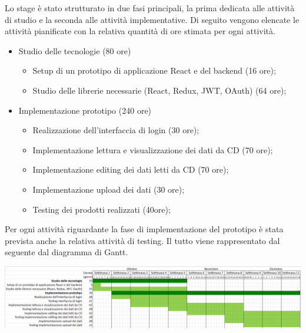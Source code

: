 Lo stage è stato strutturato in due fasi principali, la prima dedicata alle attività di studio e la seconda alle attività implementative. Di seguito vengono elencate le attività pianificate con la relativa quantità di ore stimata per ogni attività.

\begin{itemize}
\item Studio delle tecnologie (80 ore)
\begin{itemize}
\item Setup di un prototipo di applicazione React e del backend (16 ore);
\item Studio delle librerie necessarie (React, Redux, JWT, OAuth) (64 ore);
\end{itemize}
\item Implementazione prototipo (240 ore)
\begin{itemize}
\item Realizzazione dell’interfaccia di login (30 ore);
\item Implementazione lettura e visualizzazione dei dati da CD (70 ore);
\item Implementazione editing dei dati letti da CD (70 ore);
\item Implementazione upload dei dati (30 ore);
\item Testing dei prodotti realizzati (40ore);
\end{itemize}
\end{itemize}

Per ogni attività riguardante la fase di implementazione del prototipo è stata prevista anche la relativa attività di testing.
Il tutto viene rappresentato dal seguente dal diagramma di Gantt.
\begin{center}
	\includegraphics[width=14cm]{immagini/gantt.png}
\end{center}

